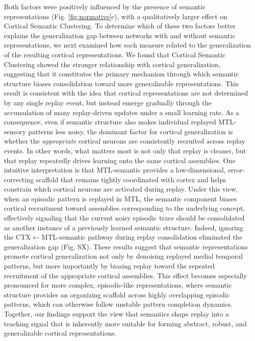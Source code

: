\documentclass{article}
\begin{document}
\newline\newline
Both factors were positively influenced by the presence of semantic representations (Fig. \ref{fig:normative}c), with a qualitatively larger effect on Cortical Semantic Clustering. To determine which of these two factors better explains the generalization gap between networks with and without semantic representations, we next examined how each measure related to the generalization of the resulting cortical representations. We found that Cortical Semantic Clustering showed the stronger relationship with cortical generalization, suggesting that it constitutes the primary mechanism through which semantic structure biases consolidation toward more generalizable representations. This result is consistent with the idea that cortical representations are not determined by any single replay event, but instead emerge gradually through the accumulation of many replay-driven updates under a small learning rate. As a consequence, even if semantic structure also makes individual replayed MTL-sensory patterns less noisy, the dominant factor for cortical generalization is whether the \textit{appropriate} cortical neurons are consistently recruited across replay events. In other words, what matters most is not only that replay is cleaner, but that replay repeatedly drives learning onto the same cortical assemblies.
\newline\newline
One intuitive interpretation is that MTL-semantic provides a low-dimensional, error-correcting scaffold that remains tightly coordinated with cortex and helps constrain which cortical neurons are activated during replay. Under this view, when an episodic pattern is replayed in MTL, the semantic component biases cortical recruitment toward assemblies corresponding to the underlying concept, effectively signaling that the current noisy episodic trace should be consolidated as another instance of a previously learned semantic structure. Indeed, ignoring the CTX$\leftarrow$MTL-semantic pathway during replay consolidation eliminated the generalization gap (Fig. SX).
\newline\newline
These results suggest that semantic representations promote cortical generalization not only by denoising replayed medial temporal patterns, but more importantly by biasing replay toward the repeated recruitment of the appropriate cortical assemblies. This effect becomes especially pronounced for more complex, episodic-like representations, where semantic structure provides an organizing scaffold across highly overlapping episodic patterns, which can otherwise follow unstable pattern completion dynamics. Together, our findings support the view that semantics shape replay into a teaching signal that is inherently more suitable for forming abstract, robust, and generalizable cortical representations.
\end{document}

